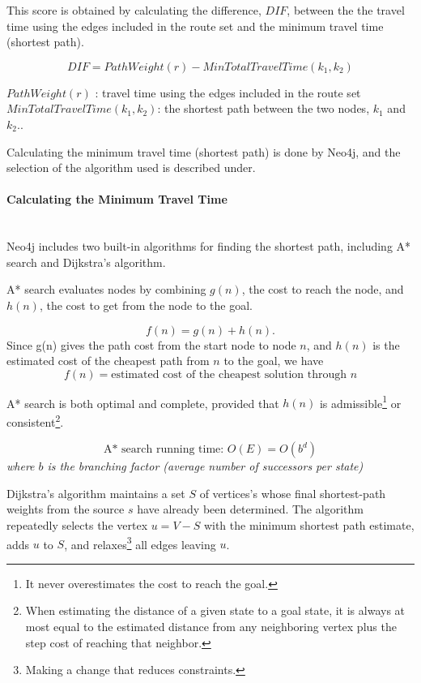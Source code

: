 This score is obtained by calculating the difference, $DIF$, between the the travel time using the edges included in the route set and the minimum travel time (shortest path). 

$$ DIF = PathWeight(r) - MinTotalTravelTime(k_{1},k_{2})$$

$ PathWeight(r)$ : travel time using the edges included in the route set
\newline
$ MinTotalTravelTime(k_{1},k_{2})$: the shortest path between the two nodes, $k_{1}$ and $k_{2}$..

Calculating the minimum travel time (shortest path) is done by Neo4j, and the selection of the algorithm used is described under.

\paragraph{Calculating the Minimum Travel Time}\mbox{}\\ 

Neo4j includes two built-in algorithms for finding the shortest path, including A* search\citep{russel10}  and Dijkstra's algorithm\citep{cormen09}. 

A* search\cite[p.93-94]{russel10} evaluates nodes by combining $g(n)$, the cost to reach the node, and $h(n)$, the cost to get from the node to the goal.

$$ f(n) = g(n) + h(n).$$
Since g(n) gives the path cost from the start node to node $n$, and $h(n)$ is the estimated cost of the cheapest path from $n$ to the goal, we have
$$f(n) = \text{estimated cost of the cheapest solution through $n$} $$ 

A* search is both optimal and complete, provided that $h(n)$ is admissible\footnote{It never overestimates the cost to reach the goal.} or consistent\footnote{When estimating the distance of a given state to a goal state, it is always at most equal to the estimated distance from any neighboring vertex plus the step cost of reaching that neighbor.}. 

$$ \text{A* search running time: } O(E) = O(b^d)$$
\textit{where $b$ is the branching factor (average number of successors per state)}

Dijkstra's algorithm \cite[p.658-662]{cormen09} maintains a set $S$ of vertices's whose final shortest-path weights from the source $s$ have already been determined. The algorithm repeatedly selects the vertex $u = V - S$ with the minimum shortest path estimate, adds $u$ to $S$, and relaxes\footnote{Making a change that reduces constraints.} all edges leaving $u$.


